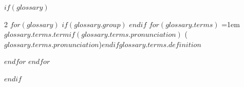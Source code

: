 $if(glossary)$
\label{glossary}

\begingroup
\small
\setlength{\parindent}{0pt}
\setlength{\parskip}{5pt}
\setlength{\columnsep}{18pt}
\raggedright
\begin{multicols}{2}
$for(glossary)$
$if(glossary.group)$
\vspace{6pt}{\centering\itshape $glossary.group$\par}\nopagebreak[4]\vspace{2pt}
$endif$
$for(glossary.terms)$
\hangindent=1em {\bfseries\scshape $glossary.terms.term$}$if(glossary.terms.pronunciation)$ (\textit{$glossary.terms.pronunciation$})$endif$\enspace $glossary.terms.definition$\par
$endfor$
$endfor$
\end{multicols}
\endgroup
$endif$
